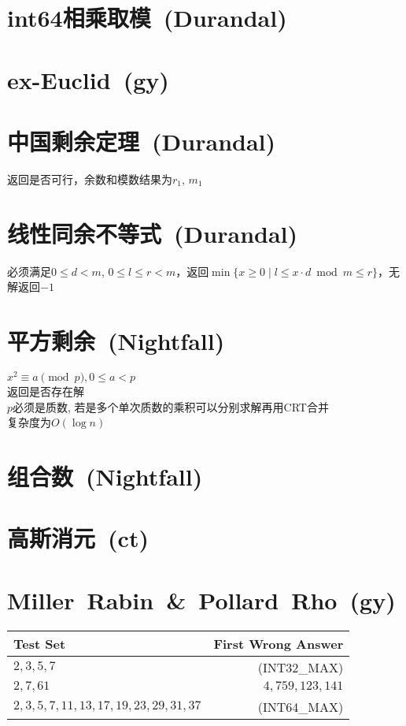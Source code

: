 \section{int64相乘取模\ \small(Durandal)}
\section{ex-Euclid\ \small(gy)}
\section{中国剩余定理\ \small(Durandal)}
    返回是否可行，余数和模数结果为$ r_1 $, $ m_1 $
\section{线性同余不等式\ \small(Durandal)}
    必须满足$ 0 \leq d < m $, $ 0 \leq l \leq r < m $，返回$ \min\lbrace x \geq 0 \mid l \leq x \cdot d \bmod m \leq r \rbrace $，无解返回$ -1 $ 
\section{平方剩余\ \small(Nightfall)}
    $ x^2 \equiv a \pmod p, 0 \leq a < p $
    \\返回是否存在解
    \\$ p $必须是质数, 若是多个单次质数的乘积可以分别求解再用CRT合并
    \\复杂度为$ O(\log n) $
\section{组合数\ \small(Nightfall)}
\section{高斯消元\ \small(ct)}
\section{Miller\ Rabin\ \&\ Pollard\ Rho\ \small(gy)}
    \begin{tabular}{l r}
        \hline
        Test Set & First Wrong Answer\\\hline
        $ 2, 3, 5, 7 $ & (INT32\_MAX)\\\hline
        $ 2, 7, 61 $ & $ 4,759,123,141 $\\\hline
        $ 2, 3, 5, 7, 11, 13, 17, 19, 23, 29, 31, 37 $ & (INT64\_MAX)\\\hline
    \end{tabular}
